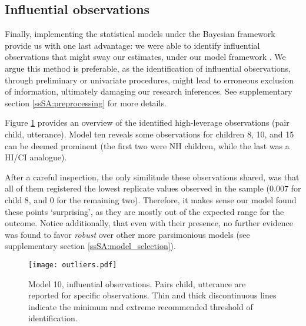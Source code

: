 \subsection{Influential observations} \label{sS:results_outliers}
%
Finally, implementing the statistical models under the Bayesian framework provide us with one last advantage: we were able to identify influential observations that might sway our estimates, under our model framework \citep{McElreath_2020}. We argue this method is preferable, as the identification of influential observations, through preliminary or univariate procedures, might lead to erroneous exclusion of information, ultimately damaging our research inferences. See supplementary section \ref{ssSA:preprocessing} for more details.

Figure \ref{fig:outliers} provides an overview of the identified high-leverage observations (pair child, utterance). Model ten reveals some observations for children 8, 10, and 15 can be deemed prominent (the first two were NH children, while the last was a HI/CI analogue). 

After a careful inspection, the only similitude these observations shared, was that all of them registered the lowest replicate values observed in the sample ($0.007$ for child 8, and $0$ for the remaining two). Therefore, it makes sense our model found these points `surprising', as they are mostly out of the expected range for the outcome. Notice additionally, that even with their presence, no further evidence was found to favor \textit{robust} over other more parsimonious models (see supplementary section \ref{ssSA:model_selection}).
%
\begin{figure}[!h]
	\centering
	\texttt{[image: outliers.pdf]}
	\caption[Model 10, influential observations]{Model 10, influential observations. Pairs child, utterance are reported for specific observations. Thin and thick discontinuous lines indicate the minimum and extreme recommended threshold of identification.}
	\label{fig:outliers}
\end{figure}
%
%